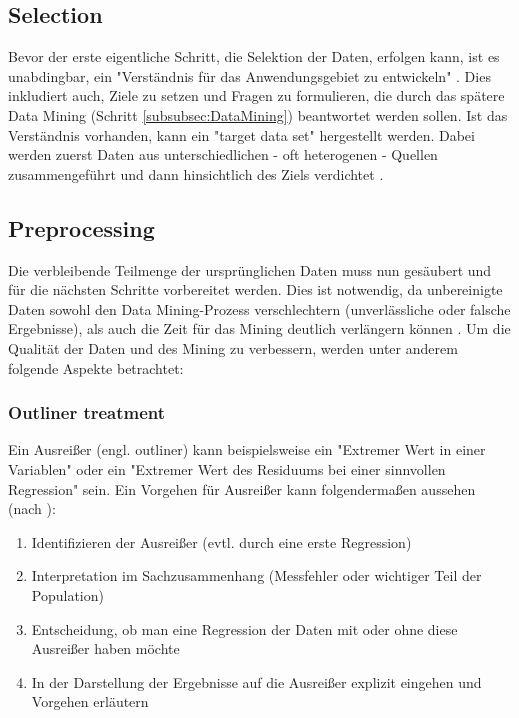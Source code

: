 \subsection{Selection}
Bevor der erste eigentliche Schritt, die Selektion der Daten, erfolgen kann, ist es unabdingbar, ein "Verständnis für das Anwendungsgebiet zu entwickeln" \citep[S.~42; eigene Übersetzung]{fayyad_data_1996}. Dies inkludiert auch, Ziele zu setzen und Fragen zu formulieren, die durch das spätere Data Mining (Schritt \ref{subsubsec:DataMining}) beantwortet werden sollen. Ist das Verständnis vorhanden, kann ein "target data set"\citep[S.~42]{fayyad_data_1996} hergestellt werden. Dabei werden zuerst Daten aus unterschiedlichen - oft heterogenen - Quellen zusammengeführt und dann hinsichtlich des Ziels verdichtet \citep[S.~70]{swamynathan_mastering_2017}.

\subsection{Preprocessing}
Die verbleibende Teilmenge der ursprünglichen Daten muss nun gesäubert und für die nächsten Schritte vorbereitet werden. Dies ist notwendig, da unbereinigte Daten sowohl den Data Mining-Prozess verschlechtern (unverlässliche oder falsche Ergebnisse), als auch die Zeit für das Mining deutlich verlängern können \citep[S.~70]{swamynathan_mastering_2017}.
Um die Qualität der Daten und des Mining zu verbessern, werden unter anderem folgende Aspekte betrachtet:

\subsubsection{Outliner treatment}
Ein Ausreißer (engl. outliner) kann beispielsweise ein "Extremer Wert in einer Variablen" oder ein "Extremer Wert des Residuums bei einer sinnvollen Regression"\citep[S.~25; Teil 5b]{hertle_datenanalyse_2016} sein. Ein Vorgehen für Ausreißer kann folgendermaßen aussehen (nach \citep[S.~25; Teil 5b]{hertle_datenanalyse_2016}):
\begin{enumerate}
\item Identifizieren der Ausreißer (evtl. durch eine erste Regression)
\item Interpretation im Sachzusammenhang (Messfehler oder wichtiger Teil der Population)
\item Entscheidung, ob man eine Regression der Daten mit oder ohne diese Ausreißer haben möchte
\item In der Darstellung der Ergebnisse auf die Ausreißer explizit eingehen und Vorgehen erläutern
\end{enumerate}

